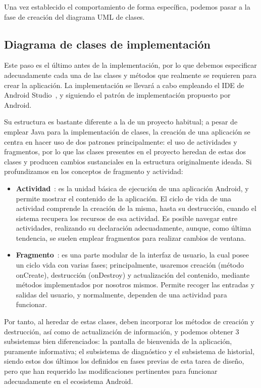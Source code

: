  Una vez establecido el comportamiento de forma específica, podemos pasar a la fase de creación del diagrama UML de clases.
 
 \subsection{Diagrama de clases de implementación}
 Este paso es el último antes de la implementación, por lo que debemos especificar adecuadamente cada una de las clases y métodos que realmente se requieren para crear la aplicación. La implementación se llevará a cabo empleando el IDE de Android Studio~\cite{androidstudio}, y siguiendo el patrón de implementación propuesto por Android.
  
 Su estructura es bastante diferente a la de un proyecto habitual; a pesar de emplear Java \cite{javalang} para la implementación de clases, la creación de una aplicación se centra en hacer uso de dos patrones principalmente: el uso de actividades y fragmentos, por lo que las clases presentes en el proyecto heredan de estas dos clases y producen cambios sustanciales en la estructura originalmente ideada. Si profundizamos en los conceptos de fragmento y actividad:
 
 \begin{itemize}
 	\item \textbf{Actividad}~\cite{actividad}: es la unidad básica de ejecución de una aplicación Android, y permite mostrar el contenido de la aplicación. El ciclo de vida de una actividad comprende la creación de la misma, hasta su destrucción, cuando el sistema recupera los recursos de esa actividad. Es posible navegar entre actividades, realizando su declaración adecuadamente, aunque, como última tendencia, se suelen emplear fragmentos para realizar cambios de ventana.
 	\item \textbf{Fragmento}~\cite{fragmento}: es una parte modular de la interfaz de usuario, la cual posee un ciclo vida con varias fases; principalmente, usaremos creación (método onCreate), destrucción (onDestroy) y actualización del contenido, mediante métodos implementados por nosotros mismos. Permite recoger las entradas y salidas del usuario, y normalmente, dependen de una actividad para funcionar.
 \end{itemize}
 
 Por tanto, al heredar de estas clases, deben incorporar los métodos de creación y destrucción, así como de actualización de información, y podemos obtener 3 subsistemas bien diferenciados: la pantalla de bienvenida de la aplicación, puramente informativa; el subsistema de diagnóstico y el subsistema de historial, siendo estos dos últimos los definidos en fases previas de esta tarea de diseño, pero que han requerido las modificaciones pertinentes para funcionar adecuadamente en el ecosistema Android.
 
